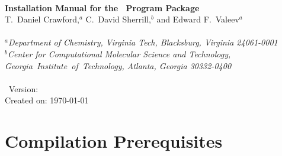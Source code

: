 \documentclass[12pt]{article}
\begin{document}


\begin{center}
\ \\
\vspace{2.0in}
{\bf {\Large Installation Manual for the \PSIthree\ Program Package}} \\
\vspace{0.5in}
T.\ Daniel Crawford,$^a$ C.\ David Sherrill,$^b$ and Edward F.\ Valeev$^{a}$ 
\\ \  \\
{\em $^a$Department of Chemistry, Virginia Tech, Blacksburg, 
Virginia 24061-0001} \\
\vspace{0.1in}
{\em $^b$Center for Computational Molecular Science and Technology, 
\mbox{Georgia Institute of Technology,} Atlanta, Georgia 30332-0400} \\
\vspace{0.1in}
\ \\
\vspace{0.3in}
\PSIthree\ Version: \PSIversion \\
Created on: \today
\end{center}

\thispagestyle{empty}

\newpage
\section{Compilation Prerequisites}
\end{document}
